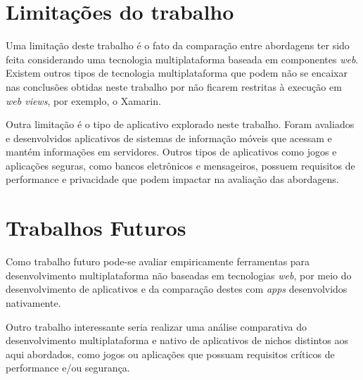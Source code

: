 \section{Limitações do trabalho} \label{section:limitacoestrabalho}
Uma limitação deste trabalho é o fato da comparação entre abordagens ter sido feita considerando uma tecnologia multiplataforma baseada em componentes \textit{web}. Existem outros tipos de tecnologia multiplataforma 
que podem não se encaixar nas conclusões obtidas neste trabalho por não ficarem restritas à execução em \textit{web views}, por exemplo, o Xamarin. 

Outra limitação é o tipo de aplicativo explorado neste trabalho. Foram avaliados e desenvolvidos aplicativos de sistemas de informação móveis que acessam e mantém informações em servidores. 
Outros tipos de aplicativos como jogos e aplicações seguras, como bancos eletrônicos e mensageiros, possuem requisitos de performance e privacidade que podem impactar na avaliação das abordagens.

\section{Trabalhos Futuros} \label{section:trabalhosfuturos}
Como trabalho futuro pode-se avaliar empiricamente ferramentas para desenvolvimento multiplataforma não baseadas em tecnologias 
\textit{web}, por meio do desenvolvimento de aplicativos e da comparação destes com \textit{apps} desenvolvidos nativamente. 

Outro trabalho interessante seria realizar uma análise comparativa do desenvolvimento multiplataforma e nativo de aplicativos de 
nichos distintos aos aqui abordados, como jogos ou aplicações que possuam requisitos críticos de performance e/ou segurança.
